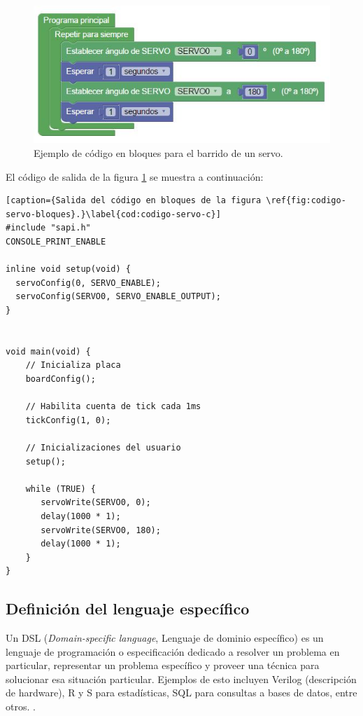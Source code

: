 \begin{figure}[H]
\centering
\includegraphics[scale=.8]{./Figures/ejemplo-servo.jpg}
\caption{Ejemplo de código en bloques para el barrido de un servo.}
\label{fig:codigo-servo-bloques}
\end{figure}

El código de salida de la figura \ref{fig:codigo-servo-bloques} se muestra a continuación:


\begin{lstlisting}[caption={Salida del código en bloques de la figura \ref{fig:codigo-servo-bloques}.}\label{cod:codigo-servo-c}] 
#include "sapi.h"
CONSOLE_PRINT_ENABLE

inline void setup(void) {
  servoConfig(0, SERVO_ENABLE);
  servoConfig(SERVO0, SERVO_ENABLE_OUTPUT);
}


void main(void) {
	// Inicializa placa
	boardConfig();

	// Habilita cuenta de tick cada 1ms
	tickConfig(1, 0);

	// Inicializaciones del usuario
	setup();

    while (TRUE) {
       servoWrite(SERVO0, 0);
       delay(1000 * 1);
       servoWrite(SERVO0, 180);
       delay(1000 * 1);
    }
}

\end{lstlisting}

\subsection{Definición del lenguaje específico}
Un DSL (\emph{Domain-specific language}, Lenguaje de dominio específico) es un lenguaje de programación o especificación dedicado a resolver un problema en particular, representar un problema específico y proveer una técnica para solucionar esa situación particular. Ejemplos de esto incluyen Verilog (descripción de hardware), R y S para estadísticas, SQL para consultas a bases de datos, entre otros. \citep{DSL}.

